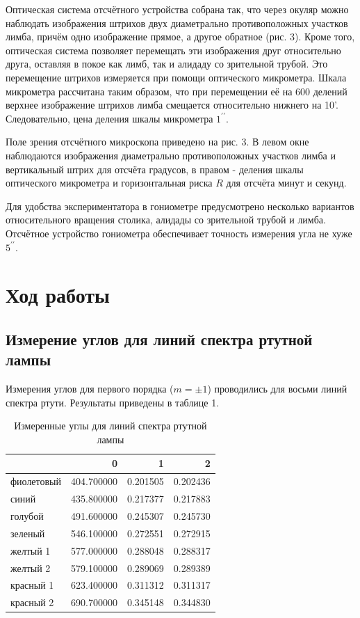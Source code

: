 \documentclass[a4paper, 12pt]{article}
\begin{document}
Оптическая система отсчётного устройства собрана так, что через окуляр можно наблюдать изображения штрихов двух диаметрально противоположных участков лимба, причём одно изображение прямое, а другое обратное (рис. 3). Кроме того, оптическая система позволяет перемещать эти изображения друг относительно друга, оставляя в покое как лимб, так и алидаду со зрительной трубой. Это перемещение штрихов измеряется при помощи оптического микрометра. Шкала микрометра рассчитана таким образом, что при перемещении её на 600 делений верхнее изображение штрихов лимба смещается относительно нижнего на 10'. Следовательно, цена деления шкалы микрометра $1^{\prime \prime}$.

Поле зрения отсчётного микроскопа приведено на рис. 3. В левом окне наблюдаются изображения диаметрально противоположных участков лимба и вертикальный штрих для отсчёта градусов, в правом - деления шкалы оптического микрометра и горизонтальная риска $R$ для отсчёта минут и секунд.

Для удобства экспериментатора в гониометре предусмотрено несколько вариантов относительного вращения столика, алидады со зрительной трубой и лимба.
Отсчётное устройство гониометра обеспечивает точность измерения угла не хуже $5^{\prime \prime}$.


\section{Ход работы}

\subsection{Измерение углов для линий спектра ртутной лампы}

Измерения углов для первого порядка (\(m = \pm 1\)) проводились для восьми линий спектра ртути. Результаты приведены в таблице 1.

\begin{table}[H]
\centering
\caption{Измеренные углы для линий спектра ртутной лампы}
\begin{tabular}{lrrr}
    \toprule
     & 0 & 1 & 2 \\
    \midrule
    фиолетовый & 404.700000 & 0.201505 & 0.202436 \\
    синий & 435.800000 & 0.217377 & 0.217883 \\
    голубой & 491.600000 & 0.245307 & 0.245730 \\
    зеленый & 546.100000 & 0.272551 & 0.272915 \\
    желтый 1 & 577.000000 & 0.288048 & 0.288317 \\
    желтый 2 & 579.100000 & 0.289069 & 0.289389 \\
    красный 1 & 623.400000 & 0.311312 & 0.311317 \\
    красный 2 & 690.700000 & 0.345148 & 0.344830 \\
    \bottomrule
    \end{tabular}
\label{tab:angles}
\end{table}
\end{document}
